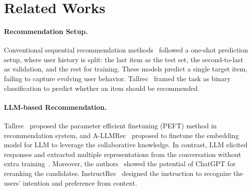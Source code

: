 \section{Related Works}

\paragraph{Recommendation Setup.} Conventional sequential recommendation methods~\cite{wangsequential, kang2018self, sun2019bert4rec, hidasi2018recurrent, kim2024large} followed a one-shot prediction setup, where user history is split: the last item as the test set, the second-to-last as validation, and the rest for training. These models predict a single target item, failing to capture evolving user behavior. Tallrec~\cite{bao2023tallrec} framed the task as binary classification to predict whether an item should be recommended. 


\paragraph{LLM-based Recommendation.} 
Tallrec~\cite{bao2023tallrec} proposed the parameter efficient finetuning (PEFT) method in recommendation system, and A-LLMRec~\cite{kim2024large} proposed  to finetune the embedding model for LLM to leverage the collaborative knowledge. 
In contrast, LLM elicited responses and extracted multiple representations from the conversation without extra training~\cite{wang2023zero}.
Moreover, the authors~\cite{dai2023uncovering} showed the potential of ChatGPT for reranking the candidates.
InstructRec~\cite{zhang2023recommendation} designed the instruction to recognize the users' intention and preference from context. 


